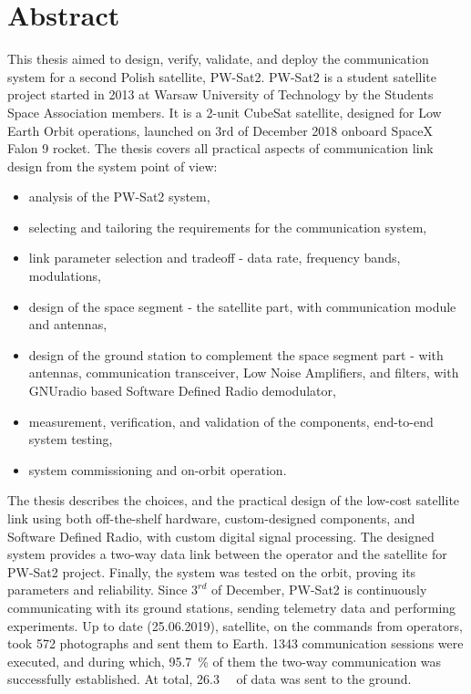 \chapter{Abstract}

This thesis aimed to design, verify, validate, and deploy the communication system for a second Polish satellite, PW-Sat2. PW-Sat2 is a student satellite project started in 2013 at Warsaw University of Technology by the Students Space Association members. It is a 2-unit CubeSat satellite, designed for Low Earth Orbit operations, launched on 3rd of December 2018 onboard SpaceX Falon 9 rocket.
The thesis covers all practical aspects of communication link design from the system point of view:
\begin{itemize}
    \setlength\itemsep{0em}
    \item analysis of the PW-Sat2 system,
    \item selecting and tailoring the requirements for the communication system,
    \item link parameter selection and tradeoff - data rate, frequency bands, modulations,
    \item design of the space segment - the satellite part, with communication module and antennas,
    \item design of the ground station to complement the space segment part - with antennas, communication transceiver, Low Noise Amplifiers, and filters, with GNUradio based Software Defined Radio demodulator,
    \item measurement, verification, and validation of the components, end-to-end system testing,
    \item system commissioning and on-orbit operation.
\end{itemize}
The thesis describes the choices, and the practical design of the low-cost satellite link using both off-the-shelf hardware, custom-designed components, and Software Defined Radio, with custom digital signal processing. The designed system provides a two-way data link between the operator and the satellite for PW-Sat2 project. Finally, the system was tested on the orbit, proving its parameters and reliability. Since $3^{rd}$ of December, PW-Sat2 is continuously communicating with its ground stations, sending telemetry data and performing experiments. Up to date (25.06.2019), satellite, on the commands from operators, took \si{572} photographs and sent them to Earth. \si{1343} communication sessions were executed, and during which, \SI{95.7}{\percent} of them the two-way communication was successfully established. At total, \SI{26.3}{\mega\byte} of data was sent to the ground.

